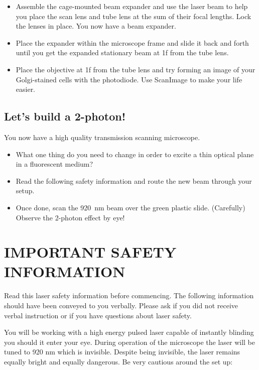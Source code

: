 \documentclass[a4paper]{report}
\begin{document}
\begin{itemize}
    \item Assemble the cage-mounted beam expander and use the laser beam to help you place the scan lens and tube lens at the sum of their focal lengths. Lock the lenses in place. You now have a beam expander.
    \item Place the expander within the microscope frame and slide it back and forth until you get the expanded stationary beam at 1f from the tube lens. 
    \item Place the objective at 1f from the tube lens and try forming an image of your Golgi-stained cells with the photodiode. Use ScanImage to make your life easier. 
\end{itemize}
 

\subsection{Let's build a 2-photon!}
You now have a high quality transmission scanning microscope. 
\begin{itemize}
    \item What one thing do you need to change in order to excite a thin optical plane in a fluorescent medium?
    \item Read the following safety information and route the new beam through your setup. 
    \item Once done, scan the 920~nm beam over the green plastic slide. (Carefully) Observe the 2-photon effect by eye! 
\end{itemize}

\section{IMPORTANT SAFETY INFORMATION}
Read this laser safety information before commencing. 
The following information should have been conveyed to you verbally. 
Please ask if you did not receive verbal instruction or if you have questions about laser safety. 

You will be working with a high energy pulsed laser capable of instantly blinding you should it enter your eye. 
During operation of the microscope the laser will be tuned to 920 nm which is invisible. 
Despite being invisible, the laser remains equally bright and equally dangerous.
Be very cautious around the set up:
\end{document}
